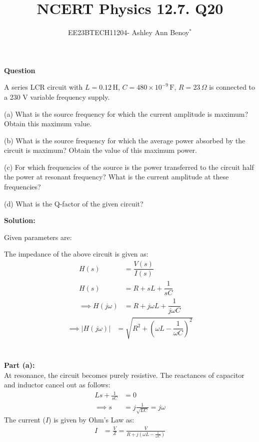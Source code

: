 \documentclass[journal,12pt,twocolumn]{IEEEtran}
\theoremstyle{remark}
\begin{document}

\vspace{3cm}

\title{NCERT Physics 12.7. Q20}
\author{EE23BTECH11204- Ashley Ann Benoy$^{*}$%
}
\maketitle
\newpage
\bigskip



\textbf{Question}

A series LCR circuit with 
\(L = 0.12 \, \text{H}\),
\(C = 480 \times 10^{-9} \, \text{F}\), 
\(R=23 \, \Omega\)
is connected to a 230 V variable frequency supply.

(a) What is the source frequency for which the current amplitude is maximum? Obtain this maximum value.

(b) What is the source frequency for which the average power absorbed by the circuit is maximum? Obtain the value of this maximum power.

(c) For which frequencies of the source is the power transferred to the circuit half the power at resonant frequency? What is the current amplitude at these frequencies?

(d) What is the Q-factor of the given circuit?

\textbf{Solution:}

Given parameters are:




The impedance of the above circuit is given as:
\begin{align}
  H(s) &= \dfrac{V(s)}{I(s)}\\
     H(s) &= R + sL + \dfrac{1}{sC}\\
     \implies H(j\omega) &= R + j\omega L + \dfrac{1}{j\omega C}
\end{align}
\begin{align}
\implies \lvert H(j\omega) \rvert &= \sqrt{R^2 + \left(\omega L - \dfrac{1}{\omega C}\right)^2}
\end{align}\\\\
\textbf{Part (a):}\\

At resonance, the circuit becomes purely resistive. The reactances of capacitor and inductor cancel out as follows:
\begin{align}
    Ls + \frac{1}{sC} &= 0 \\
    \implies s &= j\frac{1}{\sqrt{LC}} = j\omega
\end{align}
The current (\(I\)) is given by Ohm's Law as:
\begin{align}
    I &= \frac{V}{Z} = \frac{V}{R + j(\omega L - \frac{1}{\omega C})}
\end{align}
\end{document}
